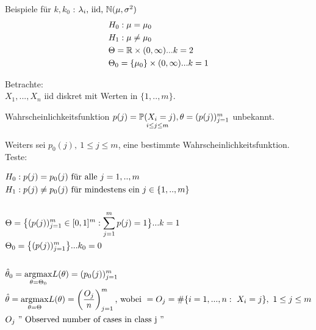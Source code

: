 \documentclass{tstextbook}
\begin{document}
	Beispiele für $k, k_0$ : $ \lambda_i \text{, iid, } \mathbb N(\mu, \sigma^2) \\$
	\[
	\begin{aligned}
			&H_0: \mu = \mu_0 \\
			&H_1: \mu \neq \mu_0 \\
			&\Theta= \mathbb R \times (0, \infty) ... k=2\\
			&\Theta_0 = \{ \mu_0 \} \times (0, \infty) ... k=1\\
	\end{aligned}
	\]
	
	\begin{example} 
	
	 Betrachte: \\
	  $X_1,...,X_n$ iid diskret mit Werten in $ \{ 1,..,m \}$.
	  
	  Wahrscheinlichkeitsfunktion $p(j)=\underset{i \le j \le m}{\mathbb P(X_i=j)}, \theta=(p(j))^m_{j=1}$ unbekannt.
	  
	  Weiters sei $p_0(j), \ 1 \le j \le m $, eine bestimmte Wahrscheinlichkeitsfunktion. Teste:
	  
	  \[
	\begin{aligned}
		&H_0: p(j)=p_0(j) \text{ für alle } j=1,..,m \\
		&H_1: p(j) \neq p_0(j) \text{ für mindestens ein } j \in \{1,..,m\} \\
		& \\
		&\Theta=\bigl\{ (p(j))^{m}_{j=1} \in [ 0 ,1 ]^m: \sum_{j=1}^{m} p(j)=1 \bigl\} ...k=1 \\
		&\Theta_0=\bigl\{  (p(j))^{m}_{j=1} \bigl\} ...k_0=0 \\
		&\\
		& \hat{\theta}_0 = \underset{\theta=\Theta_0}{\operatorname{argmax}} L(\theta) = (p_0(j))^{m}_{j=1}  \\
		& \hat{\theta} = \underset{\theta=\Theta}{\operatorname{argmax}} L(\theta) = \left( \frac{O_j}{n} \right)^m_{j=1}  \text{, wobei } =O_j =  \# \{ i=1,...,n: \ X_i=j \}, \ 1\le j \le m \\
		& O_j  \text{ '' Observed number of cases in class j ''}	\\
	\end{aligned}
	\]
	

\end{example}
\end{document}
